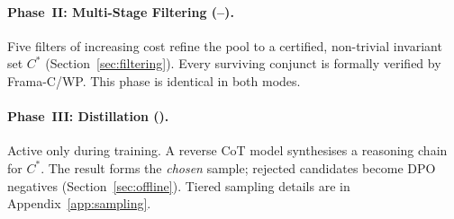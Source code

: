 \paragraph{Phase~II: Multi-Stage Filtering (--).}
Five filters of increasing cost refine the pool to a certified,
non-trivial invariant set $C^*$ (Section~\ref{sec:filtering}).
Every surviving conjunct is formally verified by Frama-C/WP.
This phase is identical in both modes.

\paragraph{Phase~III: Distillation ().}
Active only during training.
A reverse CoT model synthesises a reasoning chain for $C^*$.
The result forms the \emph{chosen} sample; rejected candidates
become DPO negatives (Section~\ref{sec:offline}).
Tiered sampling details are in Appendix~\ref{app:sampling}.
